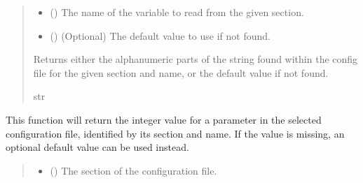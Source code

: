\documentclass[letterpaper,10pt,english]{sphinxmanual}
\begin{document}
\begin{fulllineitems}
\begin{fulllineitems}
\begin{quote}
\begin{description}
\begin{itemize}
\item {} 
\sphinxAtStartPar
{} () \textendash{} The name of the variable to read from the given section.

\item {} 
\sphinxAtStartPar
{} () \textendash{} (Optional) The default value to use if not found.

\end{itemize}

\sphinxAtStartPar
Returns either the alphanumeric parts of the string found
within the config file for the given section and name, or the
default value if not found.

\sphinxAtStartPar
str

\end{description}\end{quote}

\end{fulllineitems}


\begin{fulllineitems}
\label{\detokenize{modules/input/config_handler:qnav.input.config_handler.ConfigHandler.get_int}}
\pysigstartsignatures
{}
\pysigstopsignatures
\sphinxAtStartPar
This function will return the integer value for a parameter in the
selected configuration file, identified by its section and name.
If the value is missing, an optional default value can be used instead.
\begin{quote}\begin{description}
\begin{itemize}
\item {} 
\sphinxAtStartPar
{} () \textendash{} The section of the configuration file.


\end{itemize}
\end{description}
\end{quote}
\end{fulllineitems}
\end{fulllineitems}
\end{document}
